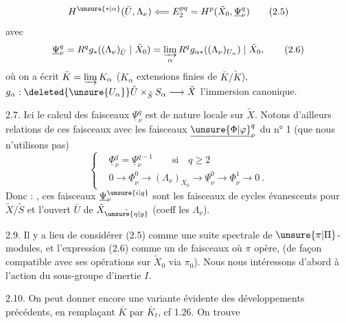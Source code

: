 
\[
H^{\unsure{*|\alpha}}(\bar U,\Lambda_\nu)\Longleftarrow E_2^{pq}=H^p(\tilde X_0,\underline\Psi_\nu^q)
\tag*{(2.5)}
\]
avec
\[
\underline\Psi_\nu^q=R^qg_*((\Lambda_\nu)_{\bar U}\mid\tilde X_0)=\varinjlim_\alpha R^qg_{\alpha*}((\Lambda_\nu)_{U_\alpha})\mid\tilde X_0,
\tag*{(2.6)}
\]
où on a écrit $\bar K=\varinjlim K_\alpha$ ($K_\alpha$ extensions finies de $\bar K/\tilde K$), $g_\alpha:\deleted{\unsure{U_\alpha}}\tilde U\mathbin{\times}_{\tilde S}S_\alpha\longrightarrow\tilde X$  l'immersion canonique.

 2.7. Ici le calcul des faisceaux $\underline\Psi_\nu^q$ est de nature locale sur $\tilde X$. Notons d'ailleurs  relations de ces faisceaux avec  les faisceaux $\underline{\unsure{\Phi|\varphi}}_\nu^q$ du n° 1 (que nous n'utilisons pas)
\[
\left\{\begin{aligned}
&\underline\Phi_\nu^q=\underline\Psi_\nu^{q-1}\qquad\text{si}\quad q\geq2\\
&0\longrightarrow\underline\Phi_\nu^0\longrightarrow(\Lambda_\nu)_{X_0}\longrightarrow\underline\Psi_\nu^0\longrightarrow\underline\Phi_\nu^1\longrightarrow0\ .
\end{aligned}\right.
\tag*{(2.8)}
\]
Donc : , ces faisceaux $\underline\Psi_\nu^{\unsure{i|q}}$ sont les faisceaux de cycles évanescents pour $\tilde X/\tilde S$ et l'ouvert $\bar U$ de $\tilde X_{\tilde{\unsure{\eta|y}}}$ (coeff les $\Lambda_\nu$).

2.9. Il y a lieu de considérer (2.5) comme une suite spectrale de $\unsure{\pi|\Pi}$-modules, et l'expression (2.6) comme un  de faisceaux  où $\pi$ opère, (de façon compatible avec ses opérations sur $\tilde X_0$ via $\pi_0$). Nous nous intéressons d'abord à l'action du sous-groupe  d'inertie $I$.

2.10. On peut donner encore une variante évidente des développements précédents, en remplaçant $\bar K$ par $\bar K_t$, cf 1.26. On trouve
